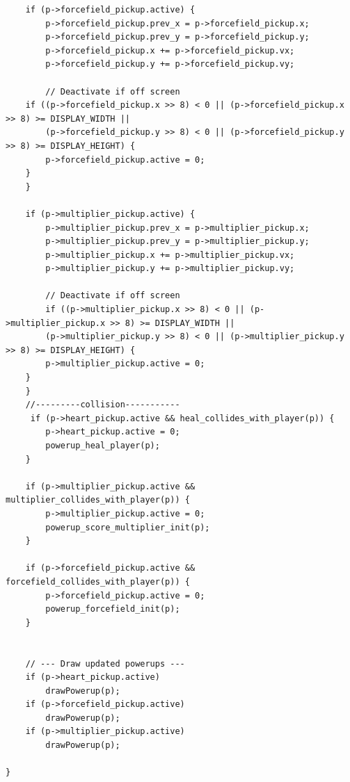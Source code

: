 \begin{lstlisting}
    if (p->forcefield_pickup.active) {
        p->forcefield_pickup.prev_x = p->forcefield_pickup.x;
        p->forcefield_pickup.prev_y = p->forcefield_pickup.y;
        p->forcefield_pickup.x += p->forcefield_pickup.vx;
        p->forcefield_pickup.y += p->forcefield_pickup.vy;

        // Deactivate if off screen
    if ((p->forcefield_pickup.x >> 8) < 0 || (p->forcefield_pickup.x >> 8) >= DISPLAY_WIDTH ||
        (p->forcefield_pickup.y >> 8) < 0 || (p->forcefield_pickup.y >> 8) >= DISPLAY_HEIGHT) {
        p->forcefield_pickup.active = 0;
    }
    }

    if (p->multiplier_pickup.active) {
        p->multiplier_pickup.prev_x = p->multiplier_pickup.x;
        p->multiplier_pickup.prev_y = p->multiplier_pickup.y;
        p->multiplier_pickup.x += p->multiplier_pickup.vx;
        p->multiplier_pickup.y += p->multiplier_pickup.vy;

        // Deactivate if off screen
        if ((p->multiplier_pickup.x >> 8) < 0 || (p->multiplier_pickup.x >> 8) >= DISPLAY_WIDTH ||
        (p->multiplier_pickup.y >> 8) < 0 || (p->multiplier_pickup.y >> 8) >= DISPLAY_HEIGHT) {
        p->multiplier_pickup.active = 0;
    }
    }
    //---------collision-----------
     if (p->heart_pickup.active && heal_collides_with_player(p)) {
        p->heart_pickup.active = 0;
        powerup_heal_player(p);
    }

    if (p->multiplier_pickup.active && multiplier_collides_with_player(p)) {
        p->multiplier_pickup.active = 0;
        powerup_score_multiplier_init(p);
    }

    if (p->forcefield_pickup.active && forcefield_collides_with_player(p)) {
        p->forcefield_pickup.active = 0;
        powerup_forcefield_init(p);
    }


    // --- Draw updated powerups ---
    if (p->heart_pickup.active)
        drawPowerup(p);
    if (p->forcefield_pickup.active)
        drawPowerup(p);
    if (p->multiplier_pickup.active)
        drawPowerup(p);

}



\end{lstlisting}
